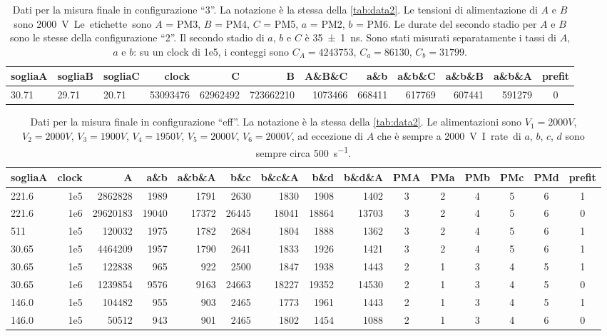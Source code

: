 \begin{table}[h]
	\small
	\hspace{-9em}
	\begin{tabular}{lll|rrrrrrrr|c}
		sogliaA & sogliaB & sogliaC & clock & C & B & A\&B\&C & a\&b & a\&b\&C & a\&b\&B & a\&b\&A & prefit \\
		\hline
		30.71 & 29.71 & 20.71 & 53093476 & 62962492 & 723662210 & 1073466 & 668411 & 617769 & 607441 & 591279 & 0
	\end{tabular}
	\caption{\label{tab:data3}
	Dati per la misura finale in configurazione ``3''.
	La notazione è la stessa della \autoref{tab:data2}.
	Le tensioni di alimentazione di $A$ e $B$ sono \SI{2000}V.
	Le etichette sono $A$ = PM3, $B$ = PM4, $C$ = PM5, $a$ = PM2, $b$ = PM6.
	Le durate del secondo stadio per $A$ e $B$ sono le stesse della configurazione ``2''.
	Il secondo stadio di $a$, $b$ e $C$ è \SI{35\pm1}{ns}.
	Sono stati misurati separatamente i tassi di $A$, $a$ e $b$:
	su un clock di 1e5, i conteggi sono $C_A=4243753$, $C_a=86130$, $C_b=31799$.}
\end{table}
\vspace{5em}
\begin{table}[h]
	\small
	\hspace{-10.5em}
	\begin{tabular}{l|rrrrrrrr|ccccc|c}
		sogliaA & clock & A &a\&b & a\&b\&A & b\&c & b\&c\&A & b\&d & b\&d\&A & PMA & PMa & PMb & PMc & PMd & prefit \\
		\hline\hline
		221.6 & 1e5   & 2862828 & 1989 & 1791 & 2630 & 1830 & 1908 & 1402 & 3 & 2 & 4 & 5 & 6 & 1           \\
		221.6 & 1e6   & 29620183 & 19040 & 17372 & 26445 & 18041 & 18864 & 13703 & 3 & 2 & 4 & 5 & 6 & 0     \\
		511 & 1e5 & 120032 & 1975 & 1782 & 2684 & 1804 & 1888 & 1362 & 3 & 2 & 4 & 5 & 6 & 1         \\
		30.65 & 1e5  & 4464209 & 1957 & 1790 & 2641 & 1833 & 1926 & 1421 & 3 & 2 & 4 & 5 & 6 & 1          \\
		\hline
		30.65 & 1e5  & 122838 & 965 & 922 & 2500 & 1847 & 1938 & 1443 & 2 & 1 & 3 & 4 & 5 & 1            \\
		30.65 & 1e6  & 1239854 & 9576 & 9163 & 24663 & 18227 & 19352 & 14530 & 2 & 1 & 3 & 4 & 5 & 0      \\
		146.0 & 1e5   & 104482 & 955 & 903 & 2465 & 1773 & 1961 & 1443 & 2 & 1 & 3 & 4 & 5 & 1             \\
		\hline
		146.0 & 1e5   & 50512 & 943 & 901 & 2465 & 1802 & 1454 & 1088 & 2 & 1 & 3 & 4 & 6 & 0             
	\end{tabular}
	\caption{\label{tab:dataeff}
	Dati per la misura finale in configurazione ``eff''.
	La notazione è la stessa della \autoref{tab:data2}.
	Le alimentazioni sono
	$V_1=\SI{2000}V$, $V_2=\SI{2000}V$, $V_3=\SI{1900}V$, $V_4=\SI{1950}V$, $V_5=\SI{2000}V$, $V_6=\SI{2000}V$,
	ad eccezione di $A$ che è sempre a \SI{2000}V.
	I~rate di $a$, $b$, $c$, $d$ sono sempre circa \SI{500}{s^{-1}}.}
\end{table}
